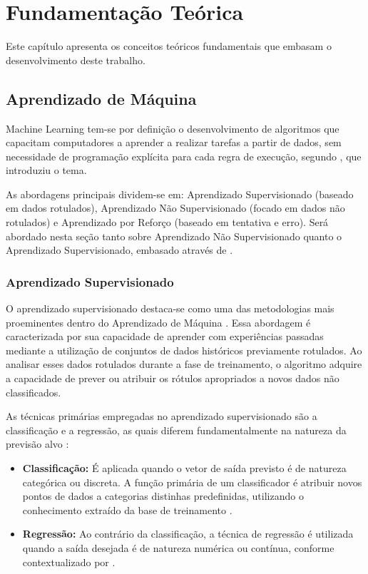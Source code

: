 \documentclass{uflamon}          %
\begin{document}

\chapter{Fundamentação Teórica}

Este capítulo apresenta os conceitos teóricos fundamentais que embasam o desenvolvimento deste trabalho. 

\section{Aprendizado de Máquina}

Machine Learning tem-se por definição o desenvolvimento de algoritmos que capacitam computadores a aprender a realizar tarefas a partir de dados, sem necessidade de programação explícita para cada regra de execução, segundo , que introduziu o tema.

As abordagens principais dividem-se em: Aprendizado Supervisionado (baseado em dados rotulados), Aprendizado Não Supervisionado (focado em dados não rotulados) e Aprendizado por Reforço (baseado em tentativa e erro). Será abordado nesta seção tanto sobre Aprendizado Não Supervisionado quanto o Aprendizado Supervisionado, embasado através de .

\subsection{Aprendizado Supervisionado}

O aprendizado supervisionado destaca-se como uma das metodologias mais proeminentes dentro do Aprendizado de Máquina \cite{bzdok2018}. Essa abordagem é caracterizada por sua capacidade de aprender com experiências passadas mediante a utilização de conjuntos de dados históricos previamente rotulados. Ao analisar esses dados rotulados durante a fase de treinamento, o algoritmo adquire a capacidade de prever ou atribuir os rótulos apropriados a novos dados não classificados.

As técnicas primárias empregadas no aprendizado supervisionado são a classificação e a regressão, as quais diferem fundamentalmente na natureza da previsão alvo \cite{bzdok2018}:

\begin{itemize}
    \item \textbf{Classificação:} É aplicada quando o vetor de saída previsto é de natureza categórica ou discreta. A função primária de um classificador é atribuir novos pontos de dados a categorias distinhas predefinidas, utilizando o conhecimento extraído da base de treinamento \cite{gopal2018}.
    \item \textbf{Regressão:} Ao contrário da classificação, a técnica de regressão é utilizada quando a saída desejada é de natureza numérica ou contínua, conforme contextualizado por .
\end{itemize}
\end{document}
